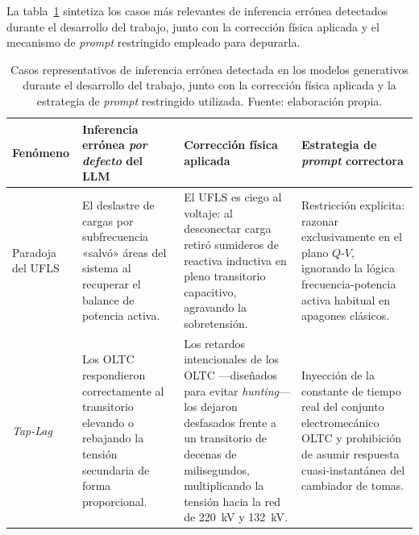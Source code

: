 La tabla~\ref{tab:alucinaciones_ia} sintetiza los casos más relevantes de
inferencia errónea detectados durante el desarrollo del trabajo, junto con la
corrección física aplicada y el mecanismo de \textit{prompt} restringido
empleado para depurarla.

\begin{table}[H]
    \centering
    \caption[Casos representativos de alucinación detectados y corrección
    física aplicada.]{Casos representativos de inferencia errónea detectada en
    los modelos generativos durante el desarrollo del trabajo, junto con la
    corrección física aplicada y la estrategia de \textit{prompt} restringido
    utilizada. Fuente: elaboración propia.}
    \label{tab:alucinaciones_ia}
    \vspace{0.2cm}
    \footnotesize
    \renewcommand{\arraystretch}{1.25}
    \begin{tabularx}{\textwidth}{@{}>{\bfseries\raggedright\arraybackslash}p{2.6cm}
                                  >{\raggedright\arraybackslash}X
                                  >{\raggedright\arraybackslash}X
                                  >{\raggedright\arraybackslash}X@{}}
        \toprule
        \textnormal{\textbf{Fenómeno}} &
        \textbf{Inferencia errónea \textit{por defecto} del LLM} &
        \textbf{Corrección física aplicada} &
        \textbf{Estrategia de \textit{prompt} correctora} \\
        \midrule

        Paradoja del UFLS &
        El deslastre de cargas por subfrecuencia «salvó» áreas del sistema al
        recuperar el balance de potencia activa. &
        El UFLS es ciego al voltaje: al desconectar carga retiró sumideros de
        reactiva inductiva en pleno transitorio capacitivo, agravando la
        sobretensión. &
        Restricción explícita: razonar exclusivamente en el plano $Q$-$V$,
        ignorando la lógica frecuencia-potencia activa habitual en apagones
        clásicos. \\

        \addlinespace[2pt]
        \textit{Tap-Lag} &
        Los OLTC respondieron correctamente al transitorio elevando o
        rebajando la tensión secundaria de forma proporcional. &
        Los retardos intencionales de los OLTC ---diseñados para evitar
        \textit{hunting}--- los dejaron desfasados frente a un transitorio de
        decenas de milisegundos, multiplicando la tensión hacia la red de
        220~kV y 132~kV. &
        Inyección de la constante de tiempo real del conjunto electromecánico
        OLTC y prohibición de asumir respuesta cuasi-instantánea del cambiador
        de tomas. \\


\end{tabularx}
\end{table}
